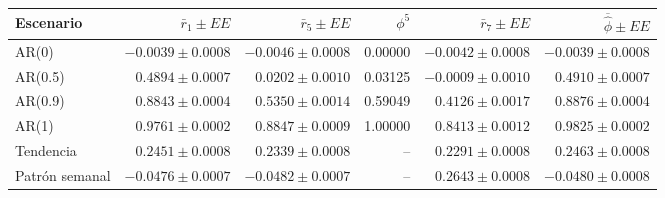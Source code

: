 \begin{center}\small\setlength{\tabcolsep}{4pt}
\begin{adjustbox}{max width=\textwidth}\begin{tabular}{lrrrrr}
\toprule
Escenario & $\bar r_1\pm EE$ & $\bar r_5\pm EE$ & $\phi^5$ & $\bar r_7\pm EE$ & $\overline{\hat\phi}\pm EE$ \\ \midrule
AR(0) & $-0.0039\pm 0.0008$ & $-0.0046\pm 0.0008$ & 0.00000 & $-0.0042\pm 0.0008$ & $-0.0039\pm 0.0008$ \\
AR(0.5) & $0.4894\pm 0.0007$ & $0.0202\pm 0.0010$ & 0.03125 & $-0.0009\pm 0.0010$ & $0.4910\pm 0.0007$ \\
AR(0.9) & $0.8843\pm 0.0004$ & $0.5350\pm 0.0014$ & 0.59049 & $0.4126\pm 0.0017$ & $0.8876\pm 0.0004$ \\
AR(1) & $0.9761\pm 0.0002$ & $0.8847\pm 0.0009$ & 1.00000 & $0.8413\pm 0.0012$ & $0.9825\pm 0.0002$ \\
Tendencia & $0.2451\pm 0.0008$ & $0.2339\pm 0.0008$ & -- & $0.2291\pm 0.0008$ & $0.2463\pm 0.0008$ \\
Patrón semanal & $-0.0476\pm 0.0007$ & $-0.0482\pm 0.0007$ & -- & $0.2643\pm 0.0008$ & $-0.0480\pm 0.0008$ \\
\bottomrule\end{tabular}\end{adjustbox}\end{center}
